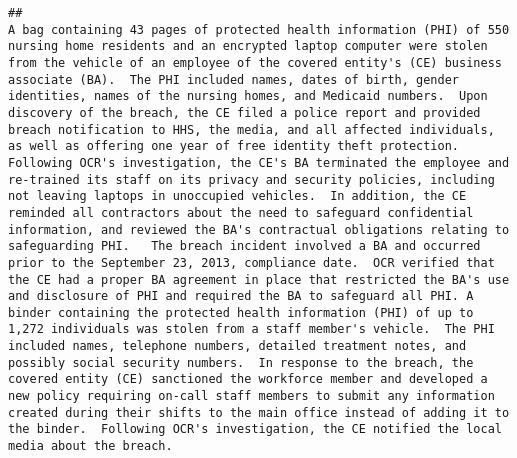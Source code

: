 \documentclass[
]{article}
\begin{document}
\begin{verbatim}
##                                                                                                                                                                                                                                                                                                                                                                                                         A bag containing 43 pages of protected health information (PHI) of 550 nursing home residents and an encrypted laptop computer were stolen from the vehicle of an employee of the covered entity's (CE) business associate (BA).  The PHI included names, dates of birth, gender identities, names of the nursing homes, and Medicaid numbers.  Upon discovery of the breach, the CE filed a police report and provided breach notification to HHS, the media, and all affected individuals, as well as offering one year of free identity theft protection.  Following OCR's investigation, the CE's BA terminated the employee and re-trained its staff on its privacy and security policies, including not leaving laptops in unoccupied vehicles.  In addition, the CE reminded all contractors about the need to safeguard confidential information, and reviewed the BA's contractual obligations relating to safeguarding PHI.   The breach incident involved a BA and occurred prior to the September 23, 2013, compliance date.  OCR verified that the CE had a proper BA agreement in place that restricted the BA's use and disclosure of PHI and required the BA to safeguard all PHI. A binder containing the protected health information (PHI) of up to 1,272 individuals was stolen from a staff member's vehicle.  The PHI included names, telephone numbers, detailed treatment notes, and possibly social security numbers.  In response to the breach, the covered entity (CE) sanctioned the workforce member and developed a new policy requiring on-call staff members to submit any information created during their shifts to the main office instead of adding it to the binder.  Following OCR's investigation, the CE notified the local media about the breach.                                                                                                                                                                                                                                                                                                                                                                                                                                                                                                                                                                                                         

\end{verbatim}
\end{document}
